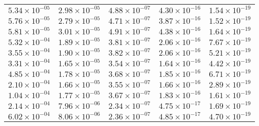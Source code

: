 \begin{table}
\begin{tabular}{lllll}
$\mathrm{5.34 \times 10^{-05}}$ & $\mathrm{2.98 \times 10^{-05}}$ & $\mathrm{4.88 \times 10^{-07}}$ & $\mathrm{4.30 \times 10^{-16}}$ & $\mathrm{1.54 \times 10^{-19}}$ \\
$\mathrm{5.76 \times 10^{-05}}$ & $\mathrm{2.79 \times 10^{-05}}$ & $\mathrm{4.71 \times 10^{-07}}$ & $\mathrm{3.87 \times 10^{-16}}$ & $\mathrm{1.52 \times 10^{-19}}$ \\
$\mathrm{5.81 \times 10^{-05}}$ & $\mathrm{3.01 \times 10^{-05}}$ & $\mathrm{4.91 \times 10^{-07}}$ & $\mathrm{4.38 \times 10^{-16}}$ & $\mathrm{1.64 \times 10^{-19}}$ \\
$\mathrm{5.32 \times 10^{-04}}$ & $\mathrm{1.89 \times 10^{-05}}$ & $\mathrm{3.81 \times 10^{-07}}$ & $\mathrm{2.06 \times 10^{-16}}$ & $\mathrm{7.67 \times 10^{-19}}$ \\
$\mathrm{3.55 \times 10^{-04}}$ & $\mathrm{1.90 \times 10^{-05}}$ & $\mathrm{3.82 \times 10^{-07}}$ & $\mathrm{2.06 \times 10^{-16}}$ & $\mathrm{5.21 \times 10^{-19}}$ \\
$\mathrm{3.31 \times 10^{-04}}$ & $\mathrm{1.65 \times 10^{-05}}$ & $\mathrm{3.54 \times 10^{-07}}$ & $\mathrm{1.64 \times 10^{-16}}$ & $\mathrm{4.42 \times 10^{-19}}$ \\
$\mathrm{4.85 \times 10^{-04}}$ & $\mathrm{1.78 \times 10^{-05}}$ & $\mathrm{3.68 \times 10^{-07}}$ & $\mathrm{1.85 \times 10^{-16}}$ & $\mathrm{6.71 \times 10^{-19}}$ \\
$\mathrm{2.10 \times 10^{-04}}$ & $\mathrm{1.66 \times 10^{-05}}$ & $\mathrm{3.55 \times 10^{-07}}$ & $\mathrm{1.66 \times 10^{-16}}$ & $\mathrm{2.89 \times 10^{-19}}$ \\
$\mathrm{1.04 \times 10^{-04}}$ & $\mathrm{1.77 \times 10^{-05}}$ & $\mathrm{3.67 \times 10^{-07}}$ & $\mathrm{1.83 \times 10^{-16}}$ & $\mathrm{1.61 \times 10^{-19}}$ \\
$\mathrm{2.14 \times 10^{-04}}$ & $\mathrm{7.96 \times 10^{-06}}$ & $\mathrm{2.34 \times 10^{-07}}$ & $\mathrm{4.75 \times 10^{-17}}$ & $\mathrm{1.69 \times 10^{-19}}$ \\
$\mathrm{6.02 \times 10^{-04}}$ & $\mathrm{8.06 \times 10^{-06}}$ & $\mathrm{2.36 \times 10^{-07}}$ & $\mathrm{4.85 \times 10^{-17}}$ & $\mathrm{4.70 \times 10^{-19}}$ \\
\bottomrule
\end{tabular}
\end{table}
